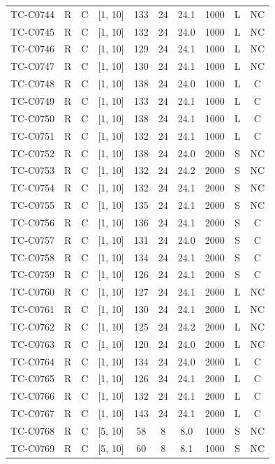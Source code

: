 \begin{longtable}{lccccccccc}
TC-C0744 & R & C & [1, 10] & 133 & 24 & 24.1 & 1000 & L & NC \\
TC-C0745 & R & C & [1, 10] & 132 & 24 & 24.0 & 1000 & L & NC \\
TC-C0746 & R & C & [1, 10] & 129 & 24 & 24.1 & 1000 & L & NC \\
TC-C0747 & R & C & [1, 10] & 130 & 24 & 24.1 & 1000 & L & NC \\
TC-C0748 & R & C & [1, 10] & 138 & 24 & 24.0 & 1000 & L & C \\
TC-C0749 & R & C & [1, 10] & 133 & 24 & 24.1 & 1000 & L & C \\
TC-C0750 & R & C & [1, 10] & 138 & 24 & 24.1 & 1000 & L & C \\
TC-C0751 & R & C & [1, 10] & 132 & 24 & 24.1 & 1000 & L & C \\
TC-C0752 & R & C & [1, 10] & 138 & 24 & 24.0 & 2000 & S & NC \\
TC-C0753 & R & C & [1, 10] & 132 & 24 & 24.2 & 2000 & S & NC \\
TC-C0754 & R & C & [1, 10] & 132 & 24 & 24.1 & 2000 & S & NC \\
TC-C0755 & R & C & [1, 10] & 135 & 24 & 24.1 & 2000 & S & NC \\
TC-C0756 & R & C & [1, 10] & 136 & 24 & 24.1 & 2000 & S & C \\
TC-C0757 & R & C & [1, 10] & 131 & 24 & 24.0 & 2000 & S & C \\
TC-C0758 & R & C & [1, 10] & 134 & 24 & 24.1 & 2000 & S & C \\
TC-C0759 & R & C & [1, 10] & 126 & 24 & 24.1 & 2000 & S & C \\
TC-C0760 & R & C & [1, 10] & 127 & 24 & 24.1 & 2000 & L & NC \\
TC-C0761 & R & C & [1, 10] & 130 & 24 & 24.1 & 2000 & L & NC \\
TC-C0762 & R & C & [1, 10] & 125 & 24 & 24.2 & 2000 & L & NC \\
TC-C0763 & R & C & [1, 10] & 120 & 24 & 24.0 & 2000 & L & NC \\
TC-C0764 & R & C & [1, 10] & 134 & 24 & 24.0 & 2000 & L & C \\
TC-C0765 & R & C & [1, 10] & 126 & 24 & 24.1 & 2000 & L & C \\
TC-C0766 & R & C & [1, 10] & 132 & 24 & 24.1 & 2000 & L & C \\
TC-C0767 & R & C & [1, 10] & 143 & 24 & 24.1 & 2000 & L & C \\
TC-C0768 & R & C & [5, 10] & 58 & 8 & 8.0 & 1000 & S & NC \\
TC-C0769 & R & C & [5, 10] & 60 & 8 & 8.1 & 1000 & S & NC \\

\end{longtable}
